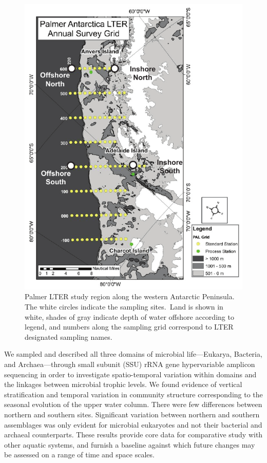 \begin{figure}[ht!] 
\centering 
	\includegraphics{Chapter_2_MIRADA/Figures/Figure_1_Map} 
	\caption[Map of the Palmer LTER study region.]{Palmer LTER study region along the western Antarctic Peninsula. The white circles indicate the sampling sites.~Land is shown in white, shades of gray indicate depth of water offshore according to legend, and numbers along the sampling grid correspond to LTER designated sampling names.} 
	\label{fig:ltergrid} 
\end{figure}

We sampled and described all three domains of microbial life---Eukarya, Bacteria, and Archaea---through small subunit (SSU) rRNA gene hypervariable amplicon sequencing in order to investigate spatio-temporal variation within domains and the linkages between microbial trophic levels. We found evidence of vertical stratification and temporal variation in community structure corresponding to the seasonal evolution of the upper water column. There were few differences between northern and southern sites. Significant variation between northern and southern assemblages was only evident for microbial eukaryotes and not their bacterial and archaeal counterparts. These results provide core data for comparative study with other aquatic systems, and furnish a baseline against which future changes may be assessed on a range of time and space scales.

